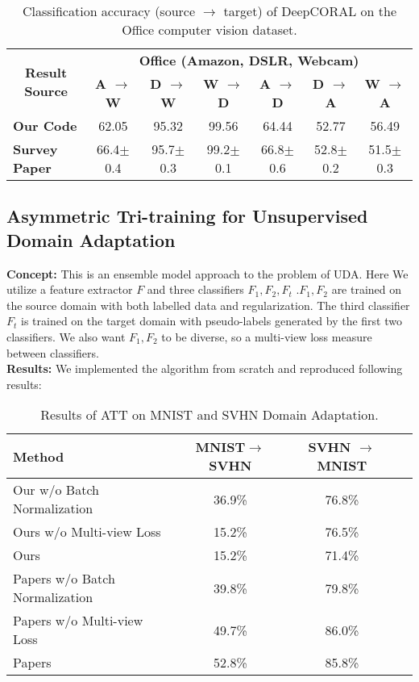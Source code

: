 \documentclass{article}
\begin{document}
\begin{table*}
  \caption{Classification accuracy (source $\rightarrow$ target) of DeepCORAL on the Office computer vision dataset.}
  \label{comparePerformance2}
  \begin{scriptsize}
  \begin{center}
  {\renewcommand{\arraystretch}{1.4}
  \begin{tabular}{@{}l cccccc@{}}
  \toprule
  \multicolumn{1}{c}{\multirow{2}{*}{\textbf{Result Source}}} & \multicolumn{6}{c}{\textbf{Office (Amazon, DSLR, Webcam)}} \\
  \cmidrule{2-7}
   & \textbf{A $\rightarrow$ W} & \textbf{D $\rightarrow$ W} & \textbf{W $\rightarrow$ D} & \textbf{A $\rightarrow$ D} & \textbf{D $\rightarrow$ A} & \textbf{W $\rightarrow$ A} \\
  \midrule
  \textbf{Our Code} & 62.05 & 95.32 & 99.56 & 64.44 & 52.77 & 56.49\\
  \hline
  \textbf{Survey Paper} & 66.4$\pm$0.4 & 95.7$\pm$0.3 & 99.2$\pm$0.1 & 66.8$\pm$0.6 & 52.8$\pm$0.2 & 51.5$\pm$0.3\\
  \bottomrule
  \end{tabular}
  }
  \end{center}
  \end{scriptsize}
  \label{tab:deepcoral}
  \end{table*}
\subsection{Asymmetric Tri-training for Unsupervised Domain Adaptation}
\textbf{Concept:} This is an ensemble model approach to the problem of UDA. Here We utilize a feature extractor \(F\) and three classifiers \(F_1,F_2,F_t\)
.\(F_1,F_2\) are trained on the source domain with both labelled data and regularization. The third classifier \(F_t\) is trained on the target domain with pseudo-labels generated by the first two classifiers. We also want \(F_1,F_2\) to be diverse, so a multi-view loss measure between classifiers. \\
\textbf{Results:} We implemented the algorithm from scratch and reproduced following results:
\begin{table}[h]
  \centering
  \caption{Results of ATT on MNIST and SVHN Domain Adaptation.}
  \label{tab:att_results}
  \begin{tabular}{lccc}
      \toprule
      \textbf{Method} & \textbf{MNIST\(\to\)SVHN} & \textbf{SVHN \(\to\) MNIST} \\
      \midrule
      Our w/o Batch Normalization & 36.9\% & 76.8\% \\
      Ours w/o Multi-view Loss & 15.2\% & 76.5\% \\
      Ours  & 15.2\% & 71.4\% \\
      \midrule
      Papers w/o Batch Normalization & 39.8\% & 79.8\% \\
      Papers w/o Multi-view Loss & 49.7\% & 86.0\% \\
      Papers  & 52.8\% & 85.8\% \\
      \bottomrule
  \end{tabular}
\end{table}
\end{document}
